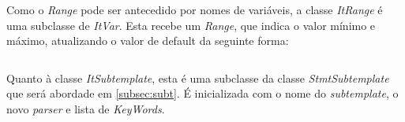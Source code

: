 \documentclass[../relatorio.tex]{subfiles}
\begin{document}
    Como o \textit{Range} pode ser antecedido por nomes de variáveis, a classe
    \textit{ItRange} é uma subclasse de \textit{ItVar}. Esta recebe um \textit{Range},
    que indica o valor mínimo e máximo, atualizando o valor de default da seguinte forma:
    
    \inputminted[firstline=9, lastline=20]{py}{../modules/It/ItRange.py}

    Quanto à classe \textit{ItSubtemplate}, esta é uma subclasse da classe \textit{StmtSubtemplate}
    que será abordade em \ref{subsec:subt}. É inicializada com o nome do \textit{subtemplate},
    o novo \textit{parser} e lista de \textit{KeyWords}.

    
    
     
\end{document}
